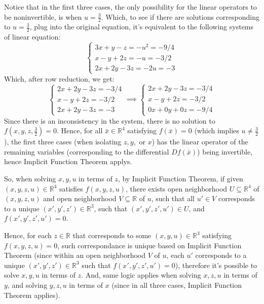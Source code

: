 \documentclass{article}
\begin{document}
Notice that in the first three cases, the only possibility for the linear operators to be noninvertible, is when $u=\frac{3}{2}$. Which, to see if there are solutions corresponding to $u=\frac{3}{2}$, plug into the original equation, it's equivalent to the following systems of linear equation:
$$\begin{cases}
    3x+y-z=-u^2=-9/4\\
    x-y+2z=-u=-3/2\\
    2x+2y-3z=-2u = -3
\end{cases}$$
Which, after row reduction, we get:
$$\begin{cases}
    2x+2y-3z=-3/4\\
    x-y+2z=-3/2\\
    2x+2y-3z = -3
\end{cases} \implies \begin{cases}
    2x+2y-3z=-3/4\\
    x-y+2z=-3/2\\
    0x+0y+0z=-9/4
\end{cases}$$
Since there is an inconsistency in the system, there is no solution to $f(x,y,z,\frac{3}{2})=0$. Hence, for all $\bar{x}\in\mathbb{R}^4$ satisfying $f(\bar{x})=0$ (which implies $u\neq \frac{3}{2}$), the first three cases (when isolating $z,y,$ or $x$) has the linear operator of the remaining variables (corresponding to the differential $Df(\bar{x})$) being invertible, hence Implicit Function Theorem applys.

So, when solving $x,y,u$ in terms of $z$, by Implicit Function Theorem, if given $(x,y,z,u)\in\mathbb{R}^4$ satisfies $f(x,y,z,u)$, there exists open neighborhood $U\subseteq \mathbb{R}^4$ of $(x,y,z,u)$ and open neighborhood $V\subseteq \mathbb{R}$ of $u$, such that all $u'\in V$ corresponds to a unique $(x',y',z')\in\mathbb{R}^3$, such that $(x',y',z',u')\in U$, and $f(x',y',z',u')=0$. 

Hence, for each $z\in\mathbb{R}$ that corresponds to some $(x,y,u)\in\mathbb{R}^3$ satisfying $f(x,y,z,u)=0$, such correspondance is unique based on Implicit Function Theorem (since within an open neighborhood $V$ of $u$, each $u'$ corresponds to a unique $(x',y',z')\in\mathbb{R}^3$ such that $f(x',y',z',u')=0$), therefore it's possible to solve $x,y,u$ in terms of $z$. And, same logic applies when solving $x,z,u$ in terms of $y$, and solving $y,z,u$ in terms of $x$ (since in all three cases, Implicit Function Theorem applies).

\hfil
\end{document}
